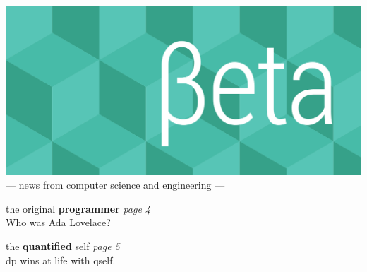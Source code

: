\documentclass[twoside]{article}
\date{26 August 2015}
\begin{document}
\thispagestyle{empty}
\begingroup%
\vspace*{-3.5cm}\centering\hspace*{-2.8cm}%
\includegraphics[trim=0mm 20mm 0mm 0mm, clip, width=22cm]{../../style/beta-logo.pdf}%
\vspace{1em}
{\sffamily\fontsize{32pt}{32pt}\selectfont --- news from computer science and engineering ---}
\endgroup\vspace*{3ex}

\center
\vfill
{\sffamily\fontsize{56pt}{72pt}\selectfont the original {\bfseries programmer}}%
\hfill{\rmfamily\fontsize{14pt}{14pt}\selectfont\it page 4}\\
{\rmfamily\fontsize{16pt}{16pt} Who was Ada Lovelace?\hfill ~}

\vspace*{6em}
{\sffamily\fontsize{56pt}{72pt}\selectfont the {\bfseries quantified} self}%
\hfill{\rmfamily\fontsize{14pt}{14pt}\selectfont\it page 5}\\
{\rmfamily\fontsize{16pt}{16pt} dp wins at life with qself.\hfill ~}
\vfill

\endcenter
\end{document}
